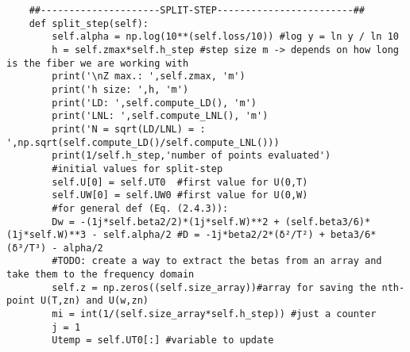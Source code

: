 \begin{verbatim}
    ##---------------------SPLIT-STEP------------------------##
    def split_step(self):
        self.alpha = np.log(10**(self.loss/10)) #log y = ln y / ln 10 
        h = self.zmax*self.h_step #step size m -> depends on how long is the fiber we are working with
        print('\nZ max.: ',self.zmax, 'm')
        print('h size: ',h, 'm')
        print('LD: ',self.compute_LD(), 'm')
        print('LNL: ',self.compute_LNL(), 'm')
        print('N = sqrt(LD/LNL) = : ',np.sqrt(self.compute_LD()/self.compute_LNL()))
        print(1/self.h_step,'number of points evaluated')
        #initial values for split-step
        self.U[0] = self.UT0  #first value for U(0,T)  
        self.UW[0] = self.UW0 #first value for U(0,W)  
        #for general def (Eq. (2.4.3)): 
        Dw = -(1j*self.beta2/2)*(1j*self.W)**2 + (self.beta3/6)*(1j*self.W)**3 - self.alpha/2 #D = -1j*beta2/2*(δ²/T²) + beta3/6*(δ³/T³) - alpha/2
        #TODO: create a way to extract the betas from an array and take them to the frequency domain
        self.z = np.zeros((self.size_array))#array for saving the nth-point U(T,zn) and U(w,zn)
        mi = int(1/(self.size_array*self.h_step)) #just a counter 
        j = 1
        Utemp = self.UT0[:] #variable to update


\end{verbatim}
